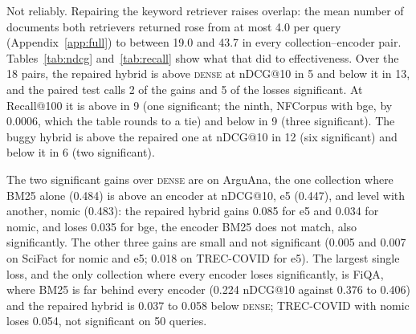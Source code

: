 \documentclass[11pt]{article}
\begin{document}
Not reliably. Repairing the keyword retriever raises overlap: the mean number of documents both retrievers returned rose from at most 4.0 per query (Appendix~\ref{app:full}) to between 19.0 and 43.7 in every collection--encoder pair. Tables~\ref{tab:ndcg} and~\ref{tab:recall} show what that did to effectiveness. Over the 18 pairs, the repaired hybrid is above \textsc{dense} at nDCG@10 in 5 and below it in 13, and the paired test calls 2 of the gains and 5 of the losses significant. At Recall@100 it is above in 9 (one significant; the ninth, NFCorpus with bge, by 0.0006, which the table rounds to a tie) and below in 9 (three significant). The buggy hybrid is above the repaired one at nDCG@10 in 12 (six significant) and below it in 6 (two significant).

The two significant gains over \textsc{dense} are on ArguAna, the one collection where BM25 alone (0.484) is above an encoder at nDCG@10, e5 (0.447), and level with another, nomic (0.483): the repaired hybrid gains 0.085 for e5 and 0.034 for nomic, and loses 0.035 for bge, the encoder BM25 does not match, also significantly. The other three gains are small and not significant (0.005 and 0.007 on SciFact for nomic and e5; 0.018 on TREC-COVID for e5). The largest single loss, and the only collection where every encoder loses significantly, is FiQA, where BM25 is far behind every encoder (0.224 nDCG@10 against 0.376 to 0.406) and the repaired hybrid is 0.037 to 0.058 below \textsc{dense}; TREC-COVID with nomic loses 0.054, not significant on 50 queries.
\end{document}
